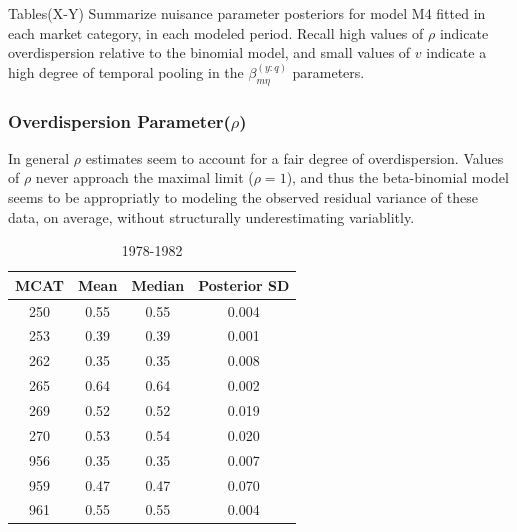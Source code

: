 \documentclass[12pt]{article}
\begin{document}
Tables(X-Y) Summarize nuisance parameter posteriors for model M4 fitted
in each market category, in each modeled period. Recall high values of
\(\rho\) indicate overdispersion relative to the binomial model, and
small values of \(v\) indicate a high degree of temporal pooling in the
\(\beta^{(y:q)}_{m\eta}\) parameters.

\subsubsection{Overdispersion Parameter(\(\rho\))}

In general \(\rho\) estimates seem to account for a fair degree of
overdispersion. Values of \(\rho\) never approach the maximal limit
(\(\rho=1\)), and thus the beta-binomial model seems to be appropriatly
to modeling the observed residual variance of these data, on average,
without structurally underestimating variablitly.

%
\begin{table}[h!]
\centering
\begin{tabular}{|c|c|c|c|}
\hline
MCAT & Mean & Median & Posterior SD     \\ \hline
250 & 0.55 & 0.55 & 0.004       \\
253 & 0.39 & 0.39 & 0.001       \\
262 & 0.35 & 0.35 & 0.008       \\
265 & 0.64 & 0.64 & 0.002       \\
269 & 0.52 & 0.52 & 0.019       \\
270 & 0.53 & 0.54 & 0.020       \\
956 & 0.35 & 0.35 & 0.007       \\
959 & 0.47 & 0.47 & 0.070       \\
961 & 0.55 & 0.55 & 0.004       \\
\hline
\end{tabular}
\caption{1978-1982}
\label{rho78}
\end{table}
\end{document}
